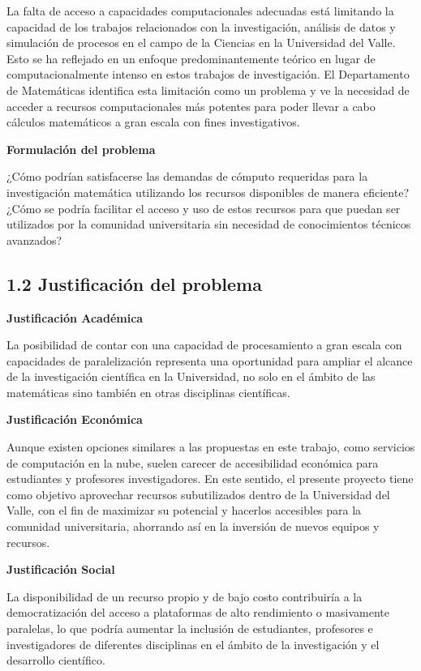\begin{spacing}{1.5}
  La falta de acceso a capacidades computacionales adecuadas está limitando la
  capacidad de los trabajos relacionados con la investigación, análisis de datos
  y simulación de procesos en el campo de la Ciencias en la Universidad del
  Valle. Esto se ha reflejado en un enfoque predominantemente teórico en lugar de
  computacionalmente intenso en estos trabajos de investigación. El Departamento
  de Matemáticas identifica esta limitación como un problema y ve la necesidad de
  acceder a recursos computacionales más potentes para poder llevar a cabo
  cálculos matemáticos a gran escala con fines investigativos.

  \textbf{Formulación del problema}

  ¿Cómo podrían satisfacerse las demandas de cómputo requeridas para la
  investigación matemática utilizando los recursos disponibles de manera
  eficiente? ¿Cómo se podría facilitar el acceso y uso de estos recursos para que
  puedan ser utilizados por la comunidad universitaria sin necesidad de
  conocimientos técnicos avanzados?

  \subsection{1.2 Justificación del problema}

  \textbf{Justificación Académica}

  La posibilidad de contar con una capacidad de procesamiento a gran escala con
  capacidades de paralelización representa una oportunidad para ampliar el
  alcance de la investigación científica en la Universidad, no solo en el ámbito
  de las matemáticas sino también en otras disciplinas científicas.

  \textbf{Justificación Económica}

  Aunque existen opciones similares a las propuestas en este trabajo, como
  servicios de computación en la nube, suelen carecer de accesibilidad económica
  para estudiantes y profesores investigadores. En este sentido, el presente
  proyecto tiene como objetivo aprovechar recursos subutilizados dentro de la
  Universidad del Valle, con el fin de maximizar su potencial y hacerlos
  accesibles para la comunidad universitaria, ahorrando así en la inversión de
  nuevos equipos y recursos.

  \textbf{Justificación Social}

  La disponibilidad de un recurso propio y de bajo costo contribuiría a la
  democratización del acceso a plataformas de alto rendimiento o masivamente
  paralelas, lo que podría aumentar la inclusión de estudiantes, profesores e
  investigadores de diferentes disciplinas en el ámbito de la investigación y el
  desarrollo científico.


\end{spacing}
